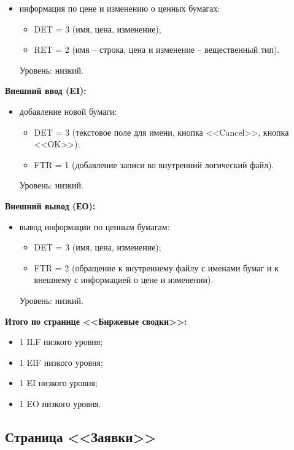 \begin{itemize}
    \item информация по цене и изменению о ценных бумагах:
    \begin{itemize}
        \item DET = 3 (имя, цена, изменение);
        \item RET = 2 (имя -- строка, цена и изменение -- вещественный тип).
    \end{itemize}
    Уровень: низкий.
\end{itemize}

\textbf{Внешний ввод (EI):}

\begin{itemize}
    \item добавление новой бумаги:
    \begin{itemize}
        \item DET = 3 (текстовое поле для имени, кнопка <<Cancel>>, кнопка <<OK>>);
        \item FTR = 1 (добавление записи во внутренний логический файл).
    \end{itemize}
    Уровень: низкий.
\end{itemize}

\textbf{Внешний вывод (ЕО):}

\begin{itemize}
    \item вывод информации по ценным бумагам:
    \begin{itemize}
        \item DET = 3 (имя, цена, изменение);
        \item FTR = 2 (обращение к внутреннему файлу с именами бумаг и к внешнему с информацией о цене и изменении).
    \end{itemize}
    Уровень: низкий.
\end{itemize}

\textbf{Итого по странице <<Биржевые сводки>>:}

\begin{itemize}
    \item 1 ILF низкого уровня;
    \item 1 EIF низкого уровня;
    \item 1 EI низкого уровня;
    \item 1 EO низкого уровня.
\end{itemize}

\clearpage

\subsection{Страница <<Заявки>>}

